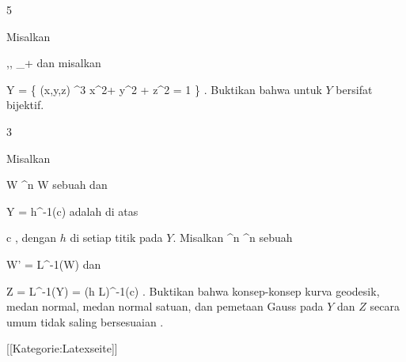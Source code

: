 {5}
{

Misalkan

\mavergleichskette
{\vergleichskette
{ \alpha,\beta, \gamma
}
{ \in }{ \R_+
}
{  }{
}
{    }{
}
{   }{
}
}
{}{}{}
dan misalkan

\mavergleichskettedisp
{\vergleichskette
{ Y
}
{ =} { \left\{ (x,y,z) \in \R^3  \mid   \alpha x^2+ \beta y^2 + \gamma z^2 = 1        \right\}
}
{ } {
}
{ } {
}
{ } {
}
}
{}{}{.}
Buktikan bahwa
untuk $Y$ bersifat bijektif.

}
{} {}

{3}
{

Misalkan

\mavergleichskette
{\vergleichskette
{ W
}
{ \subseteq }{ \R^n
}
{  }{
}
{    }{
}
{   }{
}
}
{}{}{}
 { W } { \R
} {}
sebuah
dan

\mavergleichskette
{\vergleichskette
{ Y
}
{ = }{ h^{-1}(c)
}
{  }{
}
{    }{
}
{   }{
}
}
{}{}{}
adalah
di atas

\mavergleichskette
{\vergleichskette
{ c
}
{ \in }{ \R
}
{  }{
}
{    }{
}
{   }{
}
}
{}{}{,}
dengan $h$
di setiap titik pada $Y$. Misalkan
 {\R^n } { \R^n
} {}
sebuah

\mavergleichskette
{\vergleichskette
{ W'
}
{ = }{ L^{-1}(W)
}
{  }{
}
{    }{
}
{   }{
}
}
{}{}{}
dan

\mavergleichskettedisp
{\vergleichskette
{ Z
}
{ =} { L^{-1}(Y)
}
{ =} { (h \circ L)^{-1}(c)
}
{ } {
}
{ } {
}
}
{}{}{.}
Buktikan bahwa konsep-konsep kurva geodesik, medan normal, medan normal satuan, dan pemetaan Gauss pada $Y$ dan $Z$ secara umum tidak saling bersesuaian
 {} {.}

}
{} {}

 [[Kategorie:Latexseite]]
